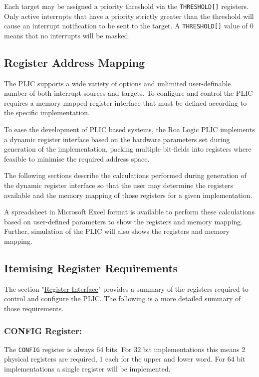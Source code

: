 Each target may be assigned a priority threshold via the
\texttt{THRESHOLD[]} registers. Only
active interrupts that have a priority strictly greater than the
threshold will cause an interrupt notification to be sent to the target.
A \texttt{THRESHOLD[]} value of 0
means that no interrupts will be masked.

\subsection{Register Address Mapping}

The PLIC supports a wide variety of options and unlimited user-definable
number of both interrupt sources and targets. To configure and control
the PLIC requires a memory-mapped register interface that must be
defined according to the specific implementation.

To ease the development of PLIC based systems, the Roa Logic PLIC
implements a dynamic register interface based on the hardware parameters
set during generation of the implementation, packing multiple bit-fields
into registers where feasible to minimise the required address space.

The following sections describe the calculations performed during
generation of the dynamic register interface so that the user may
determine the registers available and the memory mapping of those
registers for a given implementation.

A spreadsheet in Microsoft Excel format is available to perform these
calculations based on user-defined parameters to show the registers and
memory mapping. Further, simulation of the PLIC will also shows the
registers and memory mapping.

\subsection{Itemising Register Requirements}

The section "\protect\hyperlink{register-interface}{Register Interface}"
provides a summary of the registers required to control and configure
the PLIC. The following is a more detailed summary of those
requirements.

\subsubsection{CONFIG Register:}

The \texttt{CONFIG} register is always 64 bits. For 32 bit
implementations this means 2 physical registers are required, 1 each for
the upper and lower word. For 64 bit implementations a single register
will be implemented.


